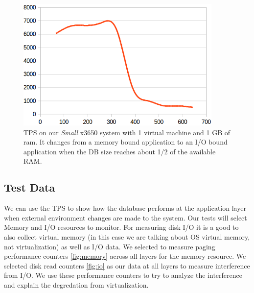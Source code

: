 \begin{figure}[!h]
  \begin{center}
  \includegraphics[width=4in]{images/SmallScale.png}
  \caption{TPS on our \emph{Small} x3650 system with 1 virtual machine and 1 GB of ram. It changes from a memory bound application to an I/O bound application when the DB size reaches about 1/2 of the available RAM.}
  \label{smallIO}
  \end{center}
\end{figure}


\subsection{Test Data}
\indent We can use the TPS to show how the database performs at the application layer when external environment changes are made to the system.  Our tests will select Memory and I/O resources to monitor.  For measuring disk I/O it is a good to also collect virtual memory (in this case we are talking about OS virtual memory, not virtualization) as well as I/O data.  We selected to measure paging performance counters \ref{fig:memory} across all layers for the memory resource.  We selected disk read counters \ref{fig:io} as our data at all layers to measure interference from I/O. 
We use these performance counters to try to analyze the interference and explain the degredation from virtualization.

